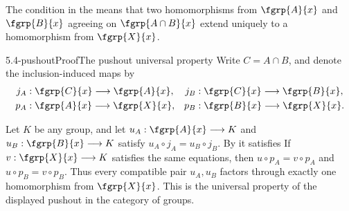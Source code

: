 The  condition in the
 means that two homomorphisms from
$\fgrp{A}{x}$ and $\fgrp{B}{x}$ agreeing on $\fgrp{A\cap B}{x}$ extend
uniquely to a homomorphism from $\fgrp{X}{x}$.

\begin{proofpassage}{5.4-pushout}{Proof}{The pushout universal property}
Write $C=A\cap B$, and denote the inclusion-induced maps by
\[
\begin{aligned}
 j_A&:\fgrp{C}{x}\longrightarrow\fgrp{A}{x},&
 j_B&:\fgrp{C}{x}\longrightarrow\fgrp{B}{x},\\
 p_A&:\fgrp{A}{x}\longrightarrow\fgrp{X}{x},&
 p_B&:\fgrp{B}{x}\longrightarrow\fgrp{X}{x}.
\end{aligned}
\]

Let $K$ be any group, and let $u_A:\fgrp{A}{x}\longrightarrow K$ and
$u_B:\fgrp{B}{x}\longrightarrow K$ satisfy
$u_A\circ j_A=u_B\circ j_B$.  
By  it satisfies
If $v:\fgrp{X}{x}\longrightarrow K$ satisfies the same equations, then
$u\circ p_A=v\circ p_A$ and $u\circ p_B=v\circ p_B$.
  Thus every compatible pair $u_A,u_B$ factors
through exactly one homomorphism from $\fgrp{X}{x}$.  This is the universal
property of the displayed pushout in the category of groups.
\end{proofpassage}

